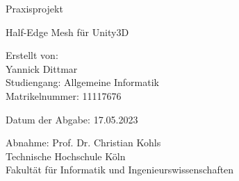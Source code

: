 \documentclass[12pt,a4paper]{scrartcl}
\begin{document}
	
	\pagestyle{empty}
	\begin{titlepage}
		
		\begin{center}
			\vspace*{2cm} 
		\end{center}
		
		\begin{center} \large 
			
			Praxisprojekt
			\vspace*{1cm}
			
			{\huge Half-Edge Mesh f\"ur Unity3D}
			\vspace*{1.5cm}
			
			Erstellt von:\\
			Yannick Dittmar\\Studiengang: Allgemeine Informatik\\ Matrikelnummer: 11117676
			
			\vspace*{1.5cm}
			
			Datum der Abgabe: 17.05.2023
			\vspace*{1.5cm}
			
			Abnahme: Prof. Dr. Christian Kohls \\[1cm]
			Technische Hochschule K\"oln\\
			Fakult\"at f\"ur Informatik und Ingenieurswissenschaften
		\end{center}
	\end{titlepage}

\tableofcontents
\setcounter{page}{1}
\newpage

\pagestyle{headings}


\newpage

\newpage

\newpage

\newpage

\newpage

\newpage



%
%	
%
%

\newpage

\printbibliography
%
%
\end{document}
